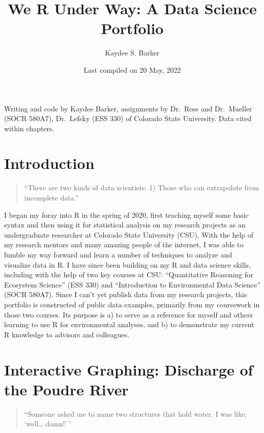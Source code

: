 \documentclass[
]{book}
\title{We R Under Way: A Data Science Portfolio}
\author{Kaydee S. Barker}
\date{Last compiled on 20 May, 2022}
\begin{document}
\maketitle

{
\setcounter{tocdepth}{1}
\tableofcontents
}
Writing and code by Kaydee Barker, assignments by Dr.~Ross and Dr.~Mueller (SOCR 580A7), Dr.~Lefsky (ESS 330) of Colorado State University. Data cited within chapters.

\hypertarget{intro}{%
\chapter{Introduction}\label{intro}}

\begin{quote}
``There are two kinds of data scientists: 1) Those who can extrapolate from incomplete data.''
\end{quote}

I began my foray into R in the spring of 2020, first teaching myself some basic syntax and then using it for statistical analysis on my research projects as an undergraduate researcher at Colorado State University (CSU). With the help of my research mentors and many amazing people of the internet, I was able to fumble my way forward and learn a number of techniques to analyze and visualize data in R. I have since been building on my R and data science skills, including with the help of two key courses at CSU: ``Quantitative Reasoning for Ecosystem Science'' (ESS 330) and ``Introduction to Environmental Data Science'' (SOCR 580A7). Since I can't yet publish data from my research projects, this portfolio is constructed of public data examples, primarily from my coursework in those two courses. Its purpose is a) to serve as a reference for myself and others learning to use R for environmental analyses, and b) to demonstrate my current R knowledge to advisors and colleagues.

\hypertarget{interactive-graphing-discharge-of-the-poudre-river}{%
\chapter{Interactive Graphing: Discharge of the Poudre River}\label{interactive-graphing-discharge-of-the-poudre-river}}

\begin{quote}
``Someone asked me to name two structures that hold water. I was like, `well\ldots{} damn!'\,''
\end{quote}
\end{document}
